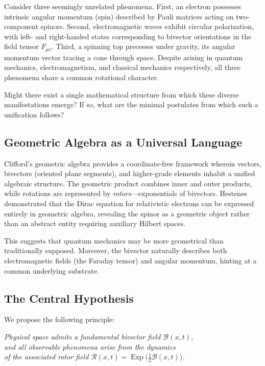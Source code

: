 \documentclass[11pt,a4paper]{article}
\newcommand{\Exp}{\operatorname{Exp}}
\newcommand{\Rotor}{\mathcal{R}}
\newcommand{\Biv}{\mathcal{B}}
\theoremstyle{definition}
\theoremstyle{plain}
\theoremstyle{remark}
\begin{document}
Consider three seemingly unrelated phenomena. First, an electron possesses intrinsic angular momentum (spin) described by Pauli matrices acting on two-component spinors. Second, electromagnetic waves exhibit circular polarization, with left- and right-handed states corresponding to bivector orientations in the field tensor $F_{\mu\nu}$. Third, a spinning top precesses under gravity, its angular momentum vector tracing a cone through space. Despite arising in quantum mechanics, electromagnetism, and classical mechanics respectively, all three phenomena share a common rotational character.

Might there exist a single mathematical structure from which these diverse manifestations emerge? If so, what are the minimal postulates from which such a unification follows?

\subsection{Geometric Algebra as a Universal Language}

Clifford's geometric algebra provides a coordinate-free framework wherein vectors, bivectors (oriented plane segments), and higher-grade elements inhabit a unified algebraic structure. The geometric product combines inner and outer products, while rotations are represented by \emph{rotors}---exponentials of bivectors. Hestenes demonstrated that the Dirac equation for relativistic electrons can be expressed entirely in geometric algebra, revealing the spinor as a geometric object rather than an abstract entity requiring auxiliary Hilbert spaces.

This suggests that quantum mechanics may be more geometrical than traditionally supposed. Moreover, the bivector naturally describes both electromagnetic fields (the Faraday tensor) and angular momentum, hinting at a common underlying substrate.

\subsection{The Central Hypothesis}

We propose the following principle:

\begin{center}
\textit{Physical space admits a fundamental bivector field $\Biv(x,t)$, \\
and all observable phenomena arise from the dynamics \\
of the associated rotor field $\Rotor(x,t)=\Exp\!\big(\tfrac{1}{2}\Biv(x,t)\big)$.}
\end{center}
\end{document}
